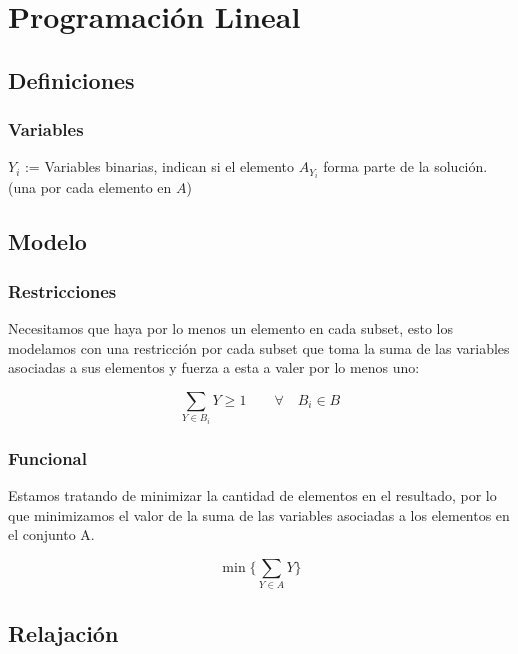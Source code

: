 \section{Programaci\'on Lineal}

\subsection{Definiciones}

\subsubsection{Variables}

\begin{center}
    $Y_i$ := Variables binarias, indican si el elemento $A_{Y_i}$ forma parte
    de la soluci\'on. \\ (una por cada elemento en $A$)
\end{center}

\subsection{Modelo}

\subsubsection{Restricciones}

Necesitamos que haya por lo menos un elemento en cada subset, esto los
modelamos con una restricci\'on por cada subset que toma la suma de las
variables asociadas a sus elementos y fuerza a esta a valer por lo menos uno:

\begin{equation}
    \sum_{Y \in B_i} Y \ge 1 \qquad \forall \quad B_i \in B
\end{equation}

\subsubsection{Funcional}

Estamos tratando de minimizar la cantidad de elementos en el resultado, por lo
que minimizamos el valor de la suma de las variables asociadas a los elementos
en el conjunto A.

\begin{equation}
    \min \{ \sum_{Y \in A} Y \}
\end{equation}

\subsection{Relajaci\'on}

